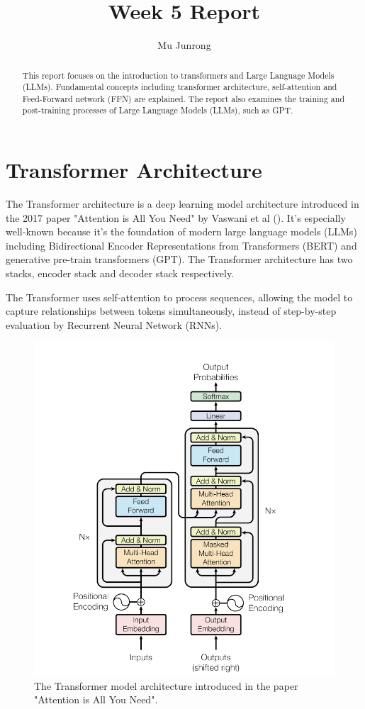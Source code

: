\documentclass{article} %
\title{Week 5 Report}
\author{Mu Junrong}
\begin{document}
\ifcolmsubmission
\linenumbers
\fi

\maketitle

\begin{abstract}
This report focuses on the introduction to transformers and Large Language Models (LLMs). Fundamental concepts including transformer architecture, self-attention and Feed-Forward network (FFN) are explained. The report also examines the training and post-training processes of Large Language Models (LLMs), such as GPT.
\end{abstract}

\section{Transformer Architecture}
The Transformer architecture is a deep learning model architecture introduced in the 2017 paper "Attention is All You Need" by Vaswani et al (\cite{vaswani2017attention}). It's especially well-known because it's the foundation of modern large language models (LLMs) including Bidirectional Encoder Representations from Transformers (BERT) and generative pre-train transformers (GPT). The Transformer architecture has two stacks, encoder stack and decoder stack respectively. 

The Transformer uses self-attention to process sequences, allowing the model to capture relationships between tokens simultaneously, instead of step-by-step evaluation by Recurrent Neural Network (RNNs).
\begin{figure} [H]
    \centering
    \includegraphics[width=0.5\linewidth]{Transformer_Architecture.png}
    \caption{The Transformer  model architecture introduced in the paper "Attention is All You Need".}
    \label{fig:enter-label}
\end{figure}
\end{document}
